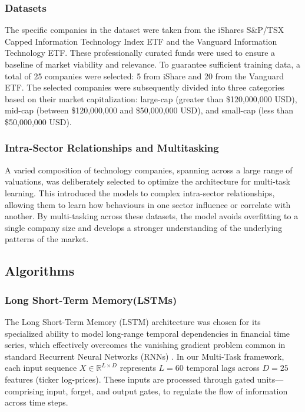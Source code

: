 \documentclass[conference]{IEEEtran}
\begin{document}
\subsubsection*{Datasets}
The specific companies in the dataset were taken from the iShares S\&P/TSX Capped Information
Technology Index ETF and the Vanguard Information Technology ETF. These professionally curated
funds were used to ensure a baseline of market viability and relevance. To guarantee sufficient
training data, a total of 25 companies were selected: 5 from iShare and 20 from the Vanguard ETF.
The selected companies were subsequently divided into three categories based on their market
capitalization: large-cap (greater than \$120,000,000 USD), mid-cap (between \$120,000,000 and
\$50,000,000 USD), and small-cap (less than \$50,000,000 USD).

\subsubsection*{Intra-Sector Relationships and Multitasking}
A varied composition of technology companies, spanning across a large range of valuations,
was deliberately selected to optimize the architecture for multi-task learning. This introduced
the models to complex intra-sector relationships, allowing them to learn how behaviours in one
sector influence or correlate with another. By multi-tasking across these datasets, the model
avoids overfitting to a single company size and develops a stronger understanding of the underlying
patterns of the market.

\subsection{Algorithms}
\subsubsection*{Long Short-Term Memory(LSTMs)}
The Long Short-Term Memory (LSTM) architecture was chosen for its specialized ability to model long-range 
temporal dependencies in financial time series, which effectively overcomes the vanishing gradient problem common in 
standard Recurrent Neural Networks (RNNs) \cite{hochreiter1997long}. In our Multi-Task framework, each input sequence
$X \in \mathbb{R}^{L \times D}$ represents $L=60$ temporal lags across $D=25$ features (ticker log-prices). These inputs are processed through gated units—comprising input, forget, and output gates, to regulate the flow of information across time steps. 
\end{document}
